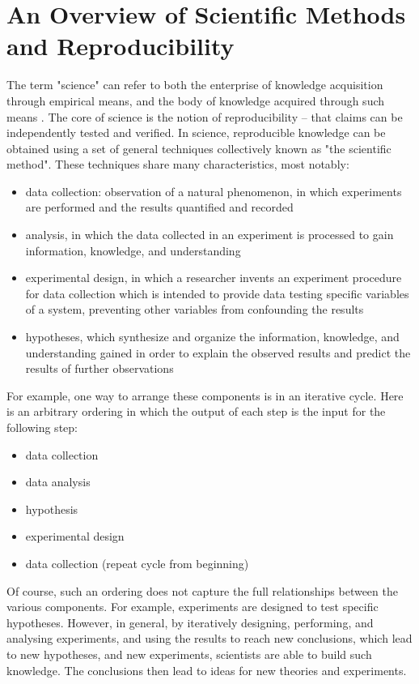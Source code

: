 \section{An Overview of Scientific Methods and Reproducibility}
The term "science" can refer to both the enterprise of knowledge acquisition 
through empirical means, and the body of knowledge acquired through such means 
\cite{drummond2012reproducible}.
The core of science is the notion of reproducibility 
\cite{russell2013reproducibility, nih2014reproducibility} -- that claims can be 
independently tested and verified.  In science, reproducible knowledge can be 
obtained using a set of general techniques collectively known as "the 
scientific method".  These techniques share many characteristics, most notably:
\begin{itemize}
 \item data collection: observation of a natural phenomenon, in which 
 experiments are performed and the results quantified and recorded
 \item analysis, in which the data collected in an experiment is processed to 
 gain information, knowledge, and understanding
 \item experimental design, in which a researcher invents an experiment 
 procedure for data collection which is intended to provide data testing 
 specific variables of a system, preventing other variables from confounding 
 the results
 \item hypotheses, which synthesize and organize the information, knowledge, 
 and understanding gained in order to explain the observed results and predict 
 the results of further observations
\end{itemize}

For example, one way to arrange these components is in an iterative cycle.  
Here is an arbitrary ordering in which the output of each step is the input 
for the following step:
\begin{itemize}
  \item data collection
  \item data analysis
  \item hypothesis
  \item experimental design
  \item data collection (repeat cycle from beginning)
\end{itemize}

Of course, such an ordering does not capture the full relationships between 
the various components.  For example, experiments are designed to test 
specific hypotheses.  However, in general, by iteratively designing, 
performing, and analysing experiments, and using the results to reach new 
conclusions, which lead to new hypotheses, and new experiments, scientists 
are able to build such knowledge.  The conclusions then lead to ideas for 
new theories and experiments.  

